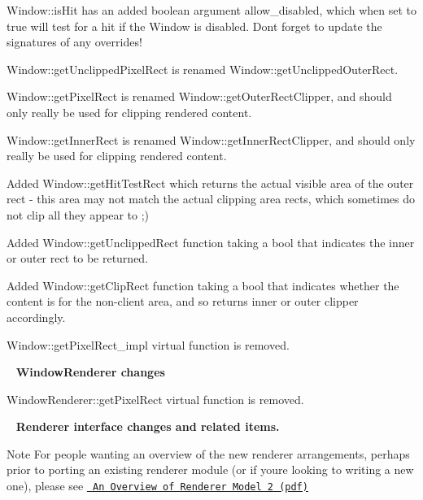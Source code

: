\begin{DoxyItemize}
\item Window\+::is\+Hit has an added boolean argument {\ttfamily allow\+\_\+disabled}, which when set to true will test for a hit if the Window is disabled. Don\textquotesingle{}t forget to update the signatures of any overrides!
\item {\ttfamily Window\+::get\+Unclipped\+Pixel\+Rect} is renamed Window\+::get\+Unclipped\+Outer\+Rect.
\item {\ttfamily Window\+::get\+Pixel\+Rect} is renamed Window\+::get\+Outer\+Rect\+Clipper, and should only really be used for clipping rendered content.
\item {\ttfamily Window\+::get\+Inner\+Rect} is renamed Window\+::get\+Inner\+Rect\+Clipper, and should only really be used for clipping rendered content.
\item Added Window\+::get\+Hit\+Test\+Rect which returns the actual visible area of the outer rect -\/ this area may not match the actual clipping area rects, which sometimes do not clip all they appear to ;)
\item Added Window\+::get\+Unclipped\+Rect function taking a bool that indicates the inner or outer rect to be returned.
\item Added Window\+::get\+Clip\+Rect function taking a bool that indicates whether the content is for the non-\/client area, and so returns inner or outer clipper accordingly.
\item {\ttfamily Window\+::get\+Pixel\+Rect\+\_\+impl} virtual function is removed.
\end{DoxyItemize}

~\newline
 {\bfseries{Window\+Renderer changes}}
\begin{DoxyItemize}
\item {\ttfamily Window\+Renderer\+::get\+Pixel\+Rect} virtual function is removed.
\end{DoxyItemize}

~\newline
 {\bfseries{Renderer interface changes and related items.}} \begin{DoxyNote}{Note}
For people wanting an overview of the new renderer arrangements, perhaps prior to porting an existing renderer module (or if you\textquotesingle{}re looking to writing a new one), please see \href{http://pdt.myby.co.uk/cegui/files/CEGUI-Renderer-Model-2.pdf}{\texttt{ An Overview of Renderer Model 2 (pdf)}}
\end{DoxyNote}

